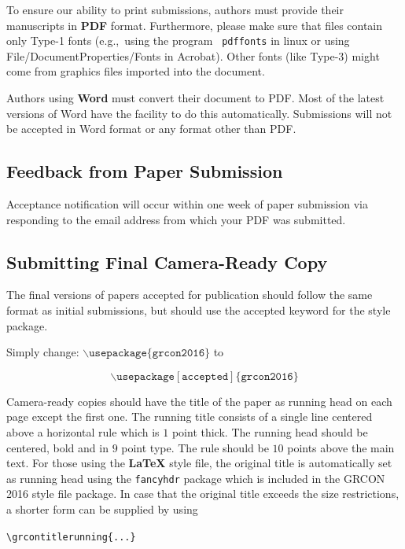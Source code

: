 \documentclass{article}
\begin{document}
\medskip

To ensure our ability to print submissions, authors must provide their
manuscripts in \textbf{PDF} format.  Furthermore, please make sure
that files contain only Type-1 fonts (e.g.,~using the program {\tt
  pdffonts} in linux or using File/DocumentProperties/Fonts in
Acrobat).  Other fonts (like Type-3) might come from graphics files
imported into the document.

Authors using \textbf{Word} must convert their document to PDF.  Most
of the latest versions of Word have the facility to do this
automatically.  Submissions will not be accepted in Word format or any
format other than PDF. 

\subsection{Feedback from Paper Submission}

Acceptance notification will occur within one week of paper submission via
responding to the email address from which your PDF was submitted.

\subsection{Submitting Final Camera-Ready Copy}

The final versions of papers accepted for publication should follow the
same format as initial submissions, but should use the accepted keyword 
for the style package.

Simply change:
$\mathtt{\backslash usepackage\{grcon2016\}}$ to 

$$\mathtt{\backslash usepackage[accepted]\{grcon2016\}}$$

\noindent

Camera-ready copies should have the title of the paper as running head
on each page except the first one.  The running title consists of a
single line centered above a horizontal rule which is $1$ point thick.
The running head should be centered, bold and in $9$ point type.  The
rule should be $10$ points above the main text.  For those using the
\textbf{\LaTeX} style file, the original title is automatically set as running
head using the {\tt fancyhdr} package which is included in the GRCON
2016 style file package.  In case that the original title exceeds the
size restrictions, a shorter form can be supplied by using

\verb|\grcontitlerunning{...}|
\end{document}
